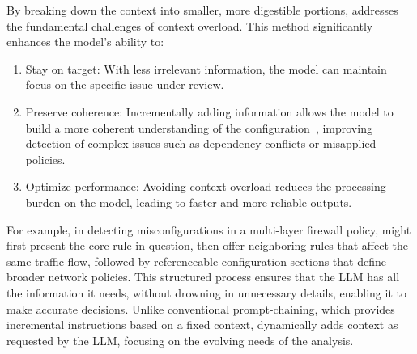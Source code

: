 By breaking down the context into smaller, more digestible portions, \sysname{} addresses the fundamental challenges of context overload. This method significantly enhances the model’s ability to:
\begin{enumerate}
    \item Stay on target: With less irrelevant information, the model can maintain focus on the specific issue under review.
    \item Preserve coherence: Incrementally adding information allows the model to build a more coherent understanding of the configuration~\cite{li2023prompt,subramonyam2024bridging}, improving detection of complex issues such as dependency conflicts or misapplied policies.
    \item Optimize performance: Avoiding context overload reduces the processing burden on the model, leading to faster and more reliable outputs.
\end{enumerate}

For example, in detecting misconfigurations in a multi-layer firewall policy, \sysname{} might first present the core rule in question, then offer neighboring rules that affect the same traffic flow, followed by referenceable configuration sections that define broader network policies. This structured process ensures that the LLM has all the information it needs, without drowning in unnecessary details, enabling it to make accurate decisions. Unlike conventional prompt-chaining, which provides incremental instructions based on a fixed context, \sysname{} dynamically adds context as requested by the LLM, focusing on the evolving needs of the analysis.

